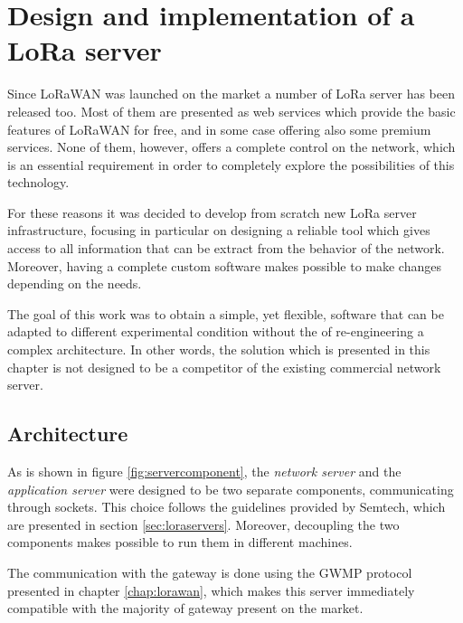 \chapter{Design and implementation of a LoRa server}
\label{chap:server}

Since LoRaWAN was launched on the market a number of LoRa server has been released too. Most of them are presented as web services which provide the basic features of LoRaWAN for free, and in some case offering also some premium services. None of them, however, offers a complete control on the network, which is an essential requirement in order to completely explore the possibilities of this technology.

For these reasons it was decided to develop from scratch new LoRa server infrastructure, focusing in particular on designing a reliable tool which gives access to all information that can be extract from the behavior of the network. Moreover, having a complete custom software makes possible to make changes depending on the needs.

The goal of this work was to obtain a simple, yet flexible, software that can be adapted to different experimental condition without the of re-engineering a complex architecture. In other words, the solution which is presented in this chapter is not designed to be a competitor of the existing commercial network server.


\section{Architecture}
As is shown in figure \ref{fig:servercomponent}, the \emph{network server} and the \emph{application server} were designed to be two separate components, communicating through sockets. This choice follows the guidelines provided by Semtech, which are presented in section \ref{sec:loraservers}. Moreover, decoupling the two components makes possible to run them in different machines.

The communication with the gateway is done using the GWMP protocol presented in chapter \ref{chap:lorawan}, which makes this server immediately compatible with the majority of gateway present on the market.

